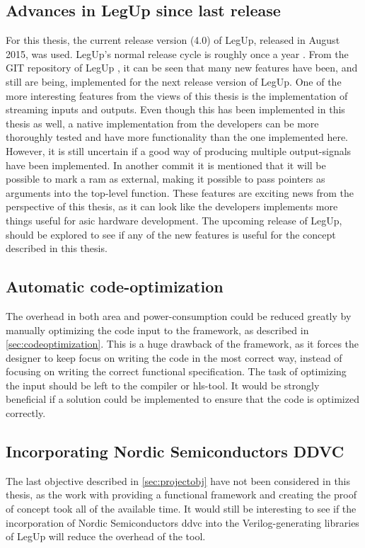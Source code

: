 \subsection{Advances in LegUp since last release}
For this thesis, the current release version (4.0) of LegUp, released in August 2015, was used. LegUp's normal release cycle is roughly once a year \cite{legupfaq}. From the GIT repository of LegUp \cite{legupgit}, it can be seen that many new features have been, and still are being, implemented for the next release version of LegUp. One of the more interesting features from the views of this thesis is the implementation of streaming inputs and outputs. Even though this has been implemented in this thesis as well, a native implementation from the developers can be more thoroughly tested and have more functionality than the one implemented here. However, it is still uncertain if a good way of producing multiple output-signals have been implemented. In another commit it is mentioned that it will be possible to mark a \gls{ram} as external, making it possible to pass pointers as arguments into the top-level function. These features are exciting news from the perspective of this thesis, as it can look like the developers implements more things useful for \gls{asic} hardware development. The upcoming release of LegUp, should be explored to see if any of the new features is useful for the concept described in this thesis. 

\subsection{Automatic code-optimization}
The overhead in both area and power-consumption could be reduced greatly by manually optimizing the code input to the framework, as described in \cref{sec:codeoptimization}. This is a huge drawback of the framework, as it forces the designer to keep focus on writing the code in the most correct way, instead of focusing on writing the correct functional specification. The task of optimizing the input should be left to the compiler or \gls{hls}-tool. It would be strongly beneficial if a solution could be implemented to ensure that the code is optimized correctly.

\subsection{Incorporating Nordic Semiconductors DDVC}
The last objective described in \cref{sec:projectobj} have not been considered in this thesis, as the work with providing a functional framework and creating the proof of concept took all of the available time. It would still be interesting to see if the incorporation of Nordic Semiconductors \gls{ddvc} into the Verilog-generating libraries of LegUp will reduce the overhead of the tool.